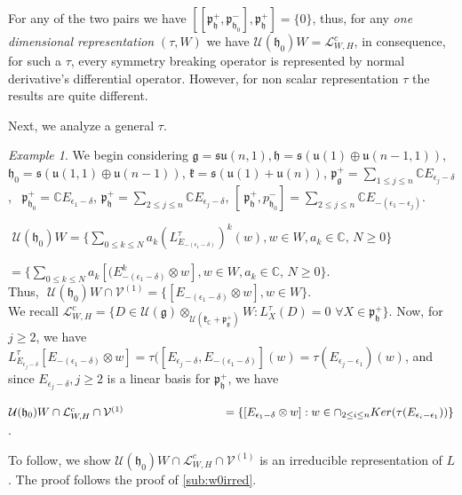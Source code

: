 \documentclass[12pt]{amsart}
\theoremstyle{definition}
\theoremstyle{remark}
\newtheorem{examp}[thm]{Example}
\newcommand{\g}{\mathfrak{g}}
\newcommand{\h}{\mathfrak{h}}
\renewcommand{\k}{{\mathfrak k}}
\newcommand{\p}{\mathfrak p}
\newcommand{\C}{{\mathbb C}}
\numberwithin{equation}{section}
\begin{document}
\smallskip

 For any of the two pairs we have $[[\p_\h^+, \p_{\h_0}^-], \p_\h^+]=\{0 \} $, thus, for any {\it one dimensional representation} $(\tau,W)$ we have $\mathcal U(\h_0)W =  \mathcal L_{W,H}^c$, in consequence, for such a $\tau$,  every symmetry breaking operator is represented by normal derivative's differential operator. However, for non scalar representation $\tau$ the results are quite different.

\smallskip

Next, we analyze  a general $\tau$.


\smallskip
\begin{examp}\label{exa:example1} We  begin considering $\g=\mathfrak{su}(n,1),   \h =\mathfrak s(\mathfrak u( 1)\oplus \mathfrak{u}(n-1,1))$,   $\h_0 =\mathfrak{s}( \mathfrak{u}(1,1) \oplus \mathfrak u(n-1))$,
$\k=\mathfrak s(\mathfrak u(1)+\mathfrak u(n))$,
 $\p_\g^+=\sum_{1\leq j \leq n}\C E_{\epsilon_j -\delta}$, $\,\,\, \p_{\h_0}^+= \C E_{\epsilon_1 -\delta}$,  $\p_\h^+=\sum_{2\leq j\leq n}   \C E_{\epsilon_j -\delta}$, $[\  \p_{\h}^+,p_{\h_0}^-]= \sum_{2\leq j \leq n}\C E_{-( \epsilon_1 -\epsilon_j) }$.

 $\,\, \mathcal U(\h_0)W= \{\sum_{0\leq k \leq N} a_k (L_{E_{-(\epsilon_1 -\delta)}}^\tau)^k(w) , w \in W, a_k \in \C, \, N\geq 0\}$

 $=\{ \sum_{0\leq k \leq N} a_k [(E_{-(\epsilon_1 -\delta)}^k \otimes w] , w \in W, a_k \in \C, \, N\geq 0\}$. \\ Thus, $\,\, \mathcal U(\h_0)W \cap \mathcal V^{(1)}= \{ [E_{-(\epsilon_1 -\delta)} \otimes w] , w \in W \}$. \\ We recall $\mathcal L_{W,H}^c=\{ D \in \mathcal U(\g) \otimes_{\mathcal U(\k_\C +\p_\g^+)} W: L_X^\tau (D)=0 \,\, \forall X \in \p_\h^+ \}$. Now,  for $j\geq 2$, we have  $ L_{E_{\epsilon_j -\delta}}^\tau [E_{-(\epsilon_1 -\delta)} \otimes w] =\tau([E_{\epsilon _j -\delta}, E_{-(\epsilon_1 -\delta)}](w)=\tau(E_{\epsilon_j -\epsilon_1})(w) $, and since $E_{ \epsilon_j -\delta}, j\geq 2$ is a linear basis for $\p_\h^+$, we have

 $\mathcal U(\h_0)W\cap \mathcal L_{W,H}^c\cap \mathcal V^{(1)} \\ \phantom{xxxxxxxxxxxxxxx}=\{ [E_{\epsilon_1-\delta} \otimes w]  : w\in \cap_{2\leq i\leq n} Ker(\tau(E_{\epsilon_i -\epsilon_1}))\}$.

To follow,  we show $\mathcal U(\h_0)W\cap \mathcal L_{W,H}^c\cap \mathcal V^{(1)}$  is an irreducible representation of $L$. The proof follows the proof of \ref{sub:w0irred}.


\end{examp}
\end{document}
